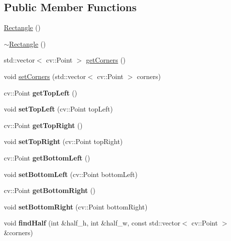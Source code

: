 \subsection*{Public Member Functions}
\begin{DoxyCompactItemize}
\item 
\mbox{\hyperlink{class_rectangle_a8a933e0ebd9e80ce91e61ffe87fd577e}{Rectangle}} ()
\item 
\mbox{\hyperlink{class_rectangle_a494c076b13aadf26efdce07d23c61ddd}{$\sim$\+Rectangle}} ()
\item 
std\+::vector$<$ cv\+::\+Point $>$ \mbox{\hyperlink{class_rectangle_ae250a28affce22b4a363d1a0213df9fa}{get\+Corners}} ()
\item 
void \mbox{\hyperlink{class_rectangle_abd4c59ad5fa7010563f2efb95c553b24}{set\+Corners}} (std\+::vector$<$ cv\+::\+Point $>$ corners)
\item 
\mbox{\label{class_rectangle_a679fadb201becac2a2eb45a689426ab0}} 
cv\+::\+Point {\bfseries get\+Top\+Left} ()
\item 
\mbox{\label{class_rectangle_a2e4b7aa32ed159fe44e580d6add40e26}} 
void {\bfseries set\+Top\+Left} (cv\+::\+Point top\+Left)
\item 
\mbox{\label{class_rectangle_a2591c940d45e3449f63f95eb13c0aba1}} 
cv\+::\+Point {\bfseries get\+Top\+Right} ()
\item 
\mbox{\label{class_rectangle_a529ad55b3f154a231b6aad0162d8430f}} 
void {\bfseries set\+Top\+Right} (cv\+::\+Point top\+Right)
\item 
\mbox{\label{class_rectangle_a33b9ffde2e54e9577cb369a59e965adc}} 
cv\+::\+Point {\bfseries get\+Bottom\+Left} ()
\item 
\mbox{\label{class_rectangle_ab393bd8f13ec5b90ed02f8d246f03ec0}} 
void {\bfseries set\+Bottom\+Left} (cv\+::\+Point bottom\+Left)
\item 
\mbox{\label{class_rectangle_a5b5aa3a6581a32dd9e2cfc27dbda4229}} 
cv\+::\+Point {\bfseries get\+Bottom\+Right} ()
\item 
\mbox{\label{class_rectangle_af5cf0dfffa35328bf5d7e890d0363354}} 
void {\bfseries set\+Bottom\+Right} (cv\+::\+Point bottom\+Right)
\item 
\mbox{\label{class_rectangle_ac88c4a06b2688500d1209957eba41335}} 
void {\bfseries find\+Half} (int \&half\+\_\+h, int \&half\+\_\+w, const std\+::vector$<$ cv\+::\+Point $>$ \&corners)
\end{DoxyCompactItemize}
